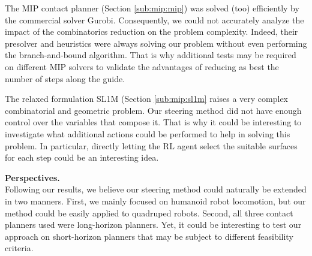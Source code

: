 The MIP contact planner (Section \ref{sub:mip:mip}) was solved (too) efficiently by the commercial solver Gurobi. Consequently, we could not accurately analyze the impact of the combinatorics reduction on the problem complexity. Indeed, their presolver and heuristics were always solving our problem without even performing the branch-and-bound algorithm.
That is why additional tests may be required on different MIP solvers to validate the advantages of reducing as best the number of steps along the guide.

The relaxed formulation SL1M (Section \ref{sub:mip:sl1m} raises a very complex combinatorial and geometric problem.
Our steering method did not have enough control over the variables that compose it. That is why it could be interesting to investigate what additional actions could be performed to help in solving this problem. In particular, directly letting the RL agent select the suitable surfaces for each step could be an interesting idea.



\hfill \break

\noindent\textbf{Perspectives.}\\

Following our results, we believe our steering method could naturally be extended in two manners.
First, we mainly focused on humanoid robot locomotion, but our method could be easily applied to quadruped robots.
Second, all three contact planners used were long-horizon planners. Yet, it could be interesting to test our approach on short-horizon planners that may be subject to different feasibility criteria.



